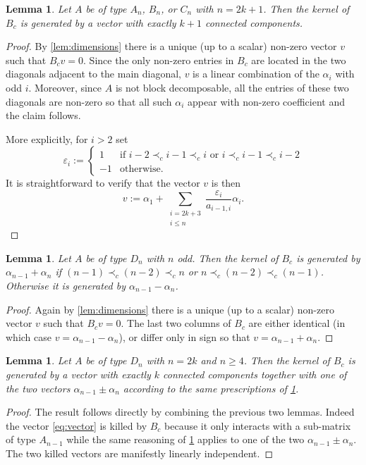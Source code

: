 \documentclass[11pt]{amsart}
\newtheorem{lemma}[theorem]{Lemma}
\numberwithin{equation}{section}
\numberwithin{figure}{section}
\begin{document}
  \begin{lemma}
    Let $A$ be of type $A_n$, $B_n$, or $C_n$ with $n=2k+1$.
    Then the kernel of $B_c$ is generated by a vector with exactly $k+1$ connected components.
  \end{lemma}
  \begin{proof}
    By \cref{lem:dimensions} there is a unique (up to a scalar) non-zero vector $v$ such that $B_cv=0$.
    Since the only non-zero entries in $B_c$ are located in the two diagonals adjacent to the main diagonal, $v$ is a linear combination of the $\alpha_i$ with odd $i$.
    Moreover, since $A$ is not block decomposable, all the entries of these two diagonals are non-zero so that all such $\alpha_i$ appear with non-zero coefficient and the claim follows.
    
    More explicitly, for $i>2$ set 
    \[
      \varepsilon_i :=
      \begin{cases}
        1 & \text{if $i-2\prec_c i-1 \prec_c i$ or $i\prec_c i-1 \prec_c i-2$}\\
        -1 & \text{otherwise.}
      \end{cases}
    \]
    It is straightforward to verify that the vector $v$ is then
    \begin{equation}
      \label{eq:vector}
      v := 
      \alpha_1 + \sum_{\substack{i=2k+3\\i\leq n}} \frac{\varepsilon_i}{a_{i-1,i}} \alpha_i.
    \end{equation}
  \end{proof}
  
  \begin{lemma}
    \label{lem:ker_Dn_even}
    Let $A$ be of type $D_n$ with $n$ odd.
    Then the kernel of $B_c$ is generated by $\alpha_{n-1}+\alpha_n$ if $(n-1) \prec_c (n-2) \prec_c n$ or $n \prec_c (n-2) \prec_c (n-1)$.
    Otherwise it is generated by $\alpha_{n-1}-\alpha_n$.
  \end{lemma}
  \begin{proof}
    Again by \cref{lem:dimensions} there is a unique (up to a scalar) non-zero vector $v$ such that $B_cv=0$.
    The last two columns of $B_c$ are either identical (in which case $v=\alpha_{n-1}-\alpha_n$), or differ only in sign so that $v=\alpha_{n-1}+\alpha_n$.
  \end{proof}

  \begin{lemma}
    Let $A$ be of type $D_n$ with $n=2k$ and $n\geq 4$.
    Then the kernel of $B_c$ is generated by a vector with exactly $k$ connected components together with one of the two vectors $\alpha_{n-1}\pm\alpha_n$ according to the same prescriptions of \cref{lem:ker_Dn_even}.
  \end{lemma}
  \begin{proof}
    The result follows directly by combining the previous two lemmas. 
    Indeed the vector \cref{eq:vector} is killed by $B_c$ because it only interacts with a sub-matrix of type $A_{n-1}$ while the same reasoning of \cref{lem:ker_Dn_even} applies to one of the two $\alpha_{n-1}\pm\alpha_n$.
    The two killed vectors are manifestly linearly independent.
  \end{proof}
\end{document}
